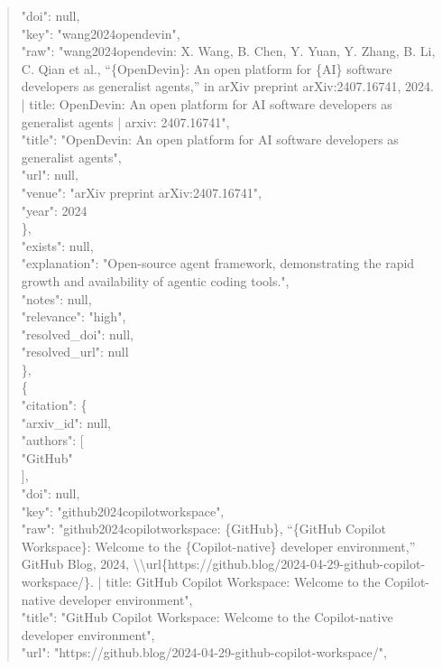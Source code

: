 \documentclass[11pt]{article}
\begin{document}
\begin{quote}
        "doi": null,\\
        "key": "wang2024opendevin",\\
        "raw": "wang2024opendevin: X. Wang, B. Chen, Y. Yuan, Y. Zhang, B. Li, C. Qian et al., ``\{OpenDevin\}: An open platform for \{AI\} software developers as generalist agents,'' in arXiv preprint arXiv:2407.16741, 2024. | title: OpenDevin: An open platform for AI software developers as generalist agents | arxiv: 2407.16741",\\
        "title": "OpenDevin: An open platform for AI software developers as generalist agents",\\
        "url": null,\\
        "venue": "arXiv preprint arXiv:2407.16741",\\
        "year": 2024\\
      \},\\
      "exists": null,\\
      "explanation": "Open-source agent framework, demonstrating the rapid growth and availability of agentic coding tools.",\\
      "notes": null,\\
      "relevance": "high",\\
      "resolved\_doi": null,\\
      "resolved\_url": null\\
    \},\\
    \{\\
      "citation": \{\\
        "arxiv\_id": null,\\
        "authors": [\\
          "GitHub"\\
        ],\\
        "doi": null,\\
        "key": "github2024copilotworkspace",\\
        "raw": "github2024copilotworkspace: \{GitHub\}, ``\{GitHub Copilot Workspace\}: Welcome to the \{Copilot-native\} developer environment,'' GitHub Blog, 2024, \textbackslash{}\textbackslash{}url\{https://github.blog/2024-04-29-github-copilot-workspace/\}. | title: GitHub Copilot Workspace: Welcome to the Copilot-native developer environment",\\
        "title": "GitHub Copilot Workspace: Welcome to the Copilot-native developer environment",\\
        "url": "https://github.blog/2024-04-29-github-copilot-workspace/",\\

\end{quote}
\end{document}
